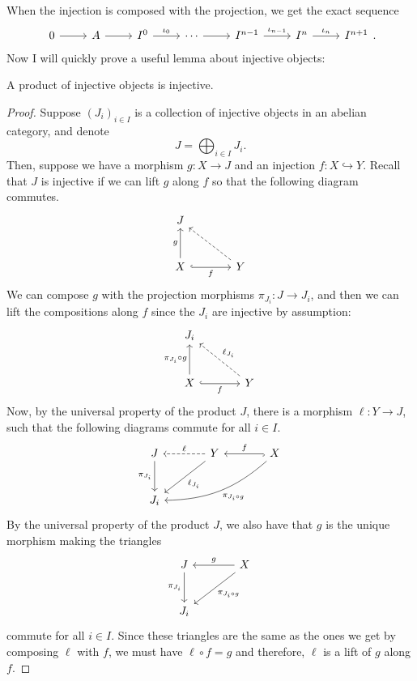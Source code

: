 When the injection is composed with the projection, we get the exact sequence
\[\begin{tikzcd}
    0\rar & A\rar & I^{0}\rar{\iota_{0}} & \cdots\rar
    & I^{n-1}\rar{\iota_{n-1}} & I^{n}\rar{\iota_{n}} & I^{n+1}
  \end{tikzcd}.\]
Now I will quickly prove a useful lemma about injective objects:
\begin{lemm}\label{lemm:product_injectives}
  A product of injective objects is injective.
\end{lemm}
\begin{proof}
  Suppose $(J_{i})_{i\in I}$ is a collection of injective objects in an
  abelian category, and denote
  \[
    J=\bigoplus_{i\in I} J_{i}.
  \]
  Then, suppose we have a morphism $g: X\to J$ and an injection
  $f:X\hookrightarrow Y$. Recall that $J$ is injective if we can lift $g$
  along $f$ so that the following diagram commutes.
  \[\begin{tikzcd}[row sep=large, column sep=large]
      J & \\ X\uar{g}\arrow[r, hook, "f"'] & Y\ular[dashed]
    \end{tikzcd}\]
  We can compose $g$ with the projection morphisms
  $\pi_{J_{i}}:J\to J_{i}$, and then we can lift the compositions along $f$
  since the $J_{i}$ are injective by assumption:
  \[\begin{tikzcd}[row sep=large, column sep=large]
        J_{i} & \\ X\uar{\pi_{J_{i}}\circ g}\arrow[r, hook, "f"']
        & Y\arrow[ul, dashed, "\ell_{J_{i}}"']
    \end{tikzcd}\]
  Now, by the universal property of the product $J$, there is a morphism
  $\ell: Y\to J$, such that the following diagrams commute for all $i\in I$.
  \[\begin{tikzcd}[row sep=large, column sep=large]
      J\arrow[d, "\pi_{J_{i}}"'] & Y\arrow[l, dashed, "\ell"']
      \dlar{\ell_{J_{i}}} & X\arrow[l, hook, "f"']
      \arrow[dll, bend left=20, "\pi_{J_{i}\circ g}"] \\ J_{i} &&
    \end{tikzcd}\]
  By the universal property of the product $J$, we also have that $g$ is the
  unique morphism making the triangles
  \[\begin{tikzcd}[row sep = large, column sep=large]
      J\arrow[d, "\pi_{J_{i}}"'] & X\arrow[l, "g"']\dlar{\pi_{J_{i}\circ g}} \\
      J_{i} &
    \end{tikzcd}\]
  commute for all $i\in I$. Since these triangles are the same as the ones
  we get by composing $\ell$ with $f$, we must have $\ell\circ f=g$
  and therefore, $\ell$ is a lift of $g$ along $f$.
\end{proof}
